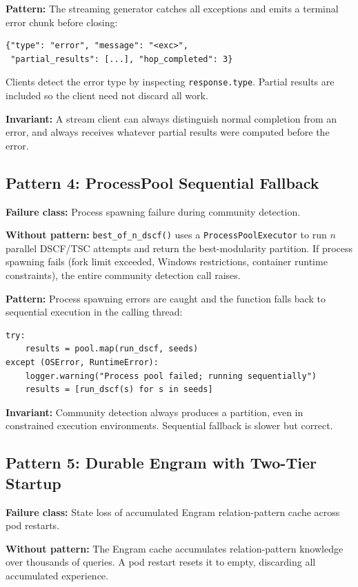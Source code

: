 \documentclass[10pt,twocolumn]{article}
\begin{document}
\textbf{Pattern:} The streaming generator catches all exceptions and emits a terminal
error chunk before closing:
\begin{lstlisting}
{"type": "error", "message": "<exc>",
 "partial_results": [...], "hop_completed": 3}
\end{lstlisting}

Clients detect the error type by inspecting \texttt{response.type}. Partial results
are included so the client need not discard all work.

\textbf{Invariant:} A stream client can always distinguish normal completion from an
error, and always receives whatever partial results were computed before the error.

\subsection{Pattern 4: ProcessPool Sequential Fallback}

\textbf{Failure class:} Process spawning failure during community detection.

\textbf{Without pattern:} \texttt{best\_of\_n\_dscf()} uses a
\texttt{ProcessPoolExecutor} to run $n$ parallel DSCF/TSC attempts and return the
best-modularity partition. If process spawning fails (fork limit exceeded, Windows
restrictions, container runtime constraints), the entire community detection call raises.

\textbf{Pattern:} Process spawning errors are caught and the function falls back to
sequential execution in the calling thread:
\begin{lstlisting}
try:
    results = pool.map(run_dscf, seeds)
except (OSError, RuntimeError):
    logger.warning("Process pool failed; running sequentially")
    results = [run_dscf(s) for s in seeds]
\end{lstlisting}

\textbf{Invariant:} Community detection always produces a partition, even in constrained
execution environments. Sequential fallback is slower but correct.

\subsection{Pattern 5: Durable Engram with Two-Tier Startup}

\textbf{Failure class:} State loss of accumulated Engram relation-pattern cache across
pod restarts.

\textbf{Without pattern:} The Engram cache accumulates relation-pattern knowledge over
thousands of queries. A pod restart resets it to empty, discarding all accumulated
experience.
\end{document}
